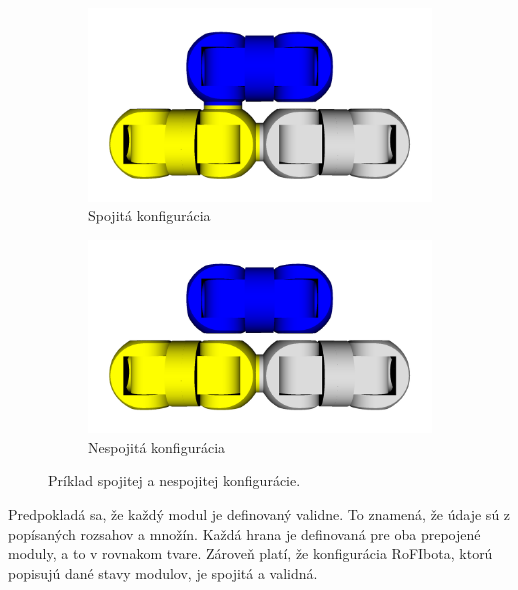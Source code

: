 \documentclass[
  digital, %
  oneside, %
  notable,   %
  lof,     %
  nolot,     %
]{fithesis3}
\begin{document}
\begin{figure}[hbt!]
    \centering
    \begin{subfigure}[b]{0.49\textwidth}
        \includegraphics[width=\textwidth]{pictures/connected_rofibot.png}
        \caption[Spojitá konfigurácia.]{Spojitá konfigurácia}
        \label{fig:connectCfg}
    \end{subfigure}
    \begin{subfigure}[b]{0.49\textwidth}
        \includegraphics[width=\textwidth]{pictures/disconnected_rofibot.png}
        \caption[Nespojitá konfigurácia.]{Nespojitá konfigurácia}
        \label{fig:disconnectCfg}
    \end{subfigure}
    \caption[Príklad konfigurácie]{Príklad spojitej a nespojitej konfigurácie.}
    \label{fig:exampleCfg}
\end{figure}

Predpokladá sa, že každý modul je definovaný validne. To znamená, že údaje sú z popísaných rozsahov a množín. Každá hrana je definovaná pre oba prepojené moduly, a to v rovnakom tvare. Zároveň platí, že konfigurácia RoFIbota, ktorú popisujú dané stavy modulov, je spojitá a validná. 
\end{document}
